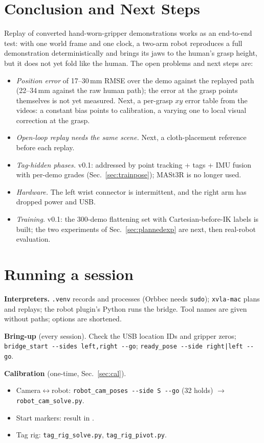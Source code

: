 \documentclass[conference,10pt]{IEEEtran}
\newcommand{\mm}{\,mm\xspace}
\begin{document}
\section{Conclusion and Next Steps}\label{sec:next}
Replay of converted hand-worn-gripper demonstrations works as an end-to-end test: with one world frame and one clock, a
two-arm robot reproduces a full demonstration deterministically and brings its jaws to the human's grasp height, but it
does not yet fold like the human. The open problems and next steps are:
\begin{itemize}
\item \emph{Position error} of 17--30\mm RMSE over the demo against the replayed path (22--34\mm against the raw
  human path); the error at the grasp points themselves is not yet measured. Next, a per-grasp $xy$ error table from the
  videos: a constant bias points to calibration, a varying one to local visual correction at the grasp.
\item \emph{Open-loop replay needs the same scene.} Next, a cloth-placement reference before each replay.
\item \emph{Tag-hidden phases.} v0.1: addressed by point tracking + tags + IMU fusion with per-demo grades
  (Sec.~\ref{sec:trainpose}); MASt3R is no longer used.
\item \emph{Hardware.} The left wrist connector is intermittent, and the right arm has dropped power and USB.
\item \emph{Training.} v0.1: the 300-demo flattening set with Cartesian-before-IK labels is built; the two experiments
  of Sec.~\ref{sec:plannedexp} are next, then real-robot evaluation.
\end{itemize}

\appendices
\section{Running a session}\label{app:run}
\raggedright
\noindent\textbf{Interpreters.} \texttt{.venv} records and processes (Orbbec needs \texttt{sudo}); \texttt{xvla-mac}
plans and replays; the robot plugin's Python runs the bridge. Tool names are given without paths; options are shortened.

\noindent\textbf{Bring-up} (every session). Check the USB location IDs and gripper zeros;
\texttt{bridge\_start -{}-sides left,right -{}-go}; \texttt{ready\_pose -{}-side right|left -{}-go}.

\noindent\textbf{Calibration} (one-time, Sec.~\ref{sec:cal}).
\begin{itemize}
\item Camera$\leftrightarrow$robot: \texttt{robot\_cam\_poses -{}-side S -{}-go} (32 holds) $\to$
  \texttt{robot\_cam\_solve.py}.
\item Start markers: result in .
\item Tag rig: \texttt{tag\_rig\_solve.py}, \texttt{tag\_rig\_pivot.py}.
\end{itemize}
\end{document}

